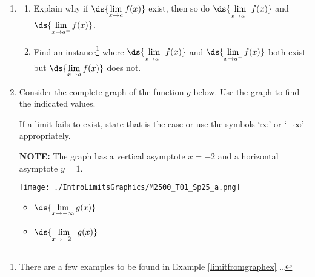 \documentclass{ximera}
\begin{document}
\begin{enumerate}
\begin{multicols}{4}
\begin{itemize}
\item $\ds{\lim_{x \rightarrow 3^{-}} f(x)}$

\item $\ds{\lim_{x \rightarrow 3^{+}} f(x)}$
\end{itemize}

\end{multicols}

\bigskip


\item\label{twosidedonesidedlimitexistexercise}  \begin{enumerate}  \item  Explain why if $\ds{\lim_{x \rightarrow a} f(x)}$ exist, then so do $\ds{\lim_{x \rightarrow a^{-}} f(x)}$ and $\ds{\lim_{x \rightarrow a^{+}} f(x)}$.

\item   Find an instance\footnote{There are a few examples to be found in Example \ref{limitfromgraphex} \ldots}  where   $\ds{\lim_{x \rightarrow a^{-}} f(x)}$ and $\ds{\lim_{x \rightarrow a^{+}} f(x)}$ both exist but $\ds{\lim_{x \rightarrow a} f(x)}$ does not.

\end{enumerate}

\item  Consider the complete graph of the function $g$ below.  Use the graph to find the indicated values.

\smallskip


If a limit fails to exist, state that is the case  or use the symbols `$\infty$' or `$-\infty$' appropriately.
  
\smallskip

 
 \textbf{NOTE:}  The graph has a vertical asymptote $x=-2$ and a horizontal asymptote $y = 1$.  



\begin{center}

\texttt{[image: ./IntroLimitsGraphics/M2500\_T01\_Sp25\_a.png]}

\end{center}

\bigskip

\begin{multicols}{4}

\begin{itemize}

\item $\ds{\lim_{x \rightarrow -\infty} g(x)}$

\item $\ds{\lim_{x \rightarrow -2^{-}} g(x)}$


\end{itemize}
\end{multicols}
\end{enumerate}
\end{document}
